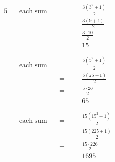 \begin{alignat*}{5}
&\,&\text{each sum}\quad&=\quad&&\frac{3(3^2+1)}{2}\\
&\,&\,&=&&\frac{3(9+1)}{2}\\
&\,&\,&=&&\frac{3\cdot10}{2}\\
&\,&\,&=&&15\\
\\ \\
&\,&\text{each sum}\quad&=\quad&&\frac{5(5^2+1)}{2}\\
&\,&\,&=&&\frac{5(25+1)}{2}\\
&\,&\,&=&&\frac{5\cdot26}{2}\\
&\,&\,&=&&65\\
\\ \\
&\,&\text{each sum}\quad&=\quad&&\frac{15(15^2+1)}{2}\\
&\,&\,&=&&\frac{15(225+1)}{2}\\
&\,&\,&=&&\frac{15\cdot226}{2}\\
&\,&\,&=&&1695
\end{alignat*}
